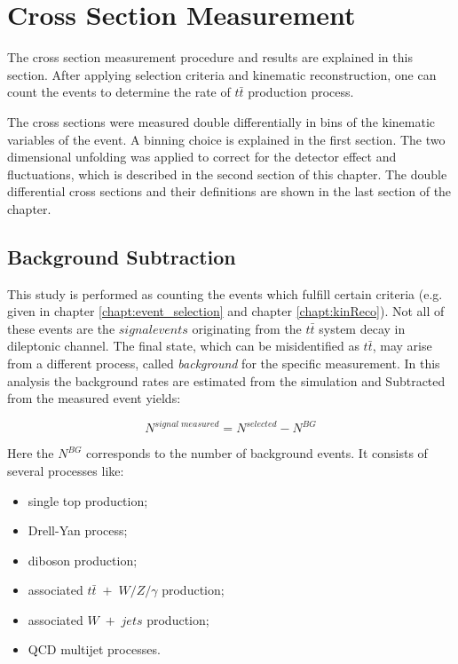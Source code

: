 \chapter{Cross Section Measurement}

The cross section measurement procedure and results are explained in this section.
After applying selection criteria and kinematic reconstruction, one can count the events to determine
the rate of $t\bar{t}$ production process.

The cross sections were measured double differentially in bins of the kinematic variables of the event.
A binning choice is explained in the first section.
The two dimensional unfolding was applied to correct for the detector effect and fluctuations, which is described
in the second section of this chapter.
The double differential cross sections and their definitions are shown in the last section of the chapter.

\section{Background Subtraction}
This study is performed as counting the events which fulfill certain criteria (e.g. given in chapter \ref{chapt:event_selection} and 
chapter \ref{chapt:kinReco}). Not all of these events are the $signal events$ originating from the $t\bar{t}$ system decay in dileptonic
channel. The final state, which can be misidentified as $t\bar{t}$, may arise from a different process, called \textit{background}
for the specific measurement. In this analysis the background rates are estimated from the simulation and Subtracted 
from the measured event yields:

\begin{equation}\label{eq:bgsub}
 N^{signal\;measured} = N^{selected} - N^{BG}
\end{equation}

Here the $N^{BG}$ corresponds to the number of background events. It consists of several processes like:

\begin{itemize}
 \item single top production;
 \item Drell-Yan process;
 \item diboson production;
 \item associated $t\bar{t}\;+\; W/Z/\gamma$ production;
 \item associated $W\;+\;jets$ production;
 \item QCD multijet processes.
\end{itemize}

